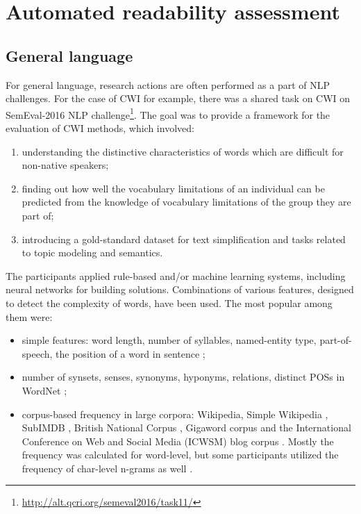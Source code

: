 \section{Automated readability assessment}

\subsection{General language}
\label{sec:general-lang}
For general language, research actions are often performed as a part of NLP challenges. For the case of CWI for example, there was a shared task on CWI on SemEval-2016 NLP challenge\footnote{\url{http://alt.qcri.org/semeval2016/task11/}}. The goal was to provide a framework for the evaluation of CWI methods, which involved:
\begin{enumerate}
    \item understanding the distinctive characteristics of words which are difficult for non-native speakers;
    \item finding out how well the vocabulary limitations of an individual can be predicted from the knowledge of vocabulary limitations of the group they are part of;
    \item introducing a gold-standard dataset for text simplification and tasks related to topic modeling and semantics.
\end{enumerate}

The participants applied rule-based and/or
machine learning systems, including neural networks for building solutions.
Combinations of various features, designed
to detect the complexity of words, have been used. The most popular among them were: 

\begin{itemize}
    \item simple features: word length, number of syllables, named-entity type, part-of-speech, the position of a word in sentence \citep{Bingel-SemEval2016};
    
    \item number of synsets, senses, synonyms, hyponyms, relations, distinct POSs in WordNet \citep{Ronzano-SemEval2016};
    
    \item corpus-based frequency in large corpora: Wikipedia, Simple Wikipedia \citep{Kauchak-2013}, SubIMDB \citep{Paetzold-SemEval2016solution}, British National Corpus \citep{Ronzano-SemEval2016}, Gigaword corpus and the International Conference on Web and Social Media (ICWSM) blog corpus \citep{Brooke-SemEval2016}. Mostly the frequency was calculated for word-level, but some participants utilized the frequency of char-level n-grams as well \citep{Bingel-SemEval2016}.
\end{itemize}

